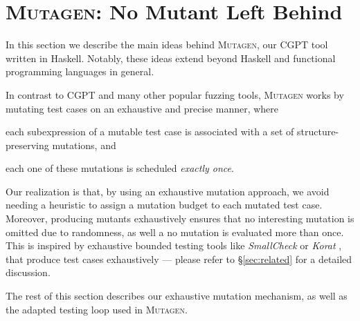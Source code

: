 \documentclass[sigconf,review,anonymous]{acmart}
\newcommand{\mutagen}{\textsc{Mutagen}\xspace}
\begin{document}
\section{\mutagen: No Mutant Left Behind}
\label{sec:mutagen}

In this section we describe the main ideas behind \mutagen, our CGPT tool
written in Haskell.
%
Notably, these ideas extend beyond Haskell and functional programming languages
in general.
%

In contrast to CGPT and many other popular fuzzing tools, \mutagen works by
mutating test cases on an exhaustive and precise manner, where
%
\begin{inparaenum}
  \item each subexpression of a mutable test case is associated with a set of
    structure-preserving mutations, and
  \item each one of these mutations is scheduled \emph{exactly once}.
\end{inparaenum}
%
%
Our realization is that, by using an exhaustive mutation approach, we avoid
needing a heuristic to assign a mutation budget to each mutated test case.
%
Moreover, producing mutants exhaustively ensures that no interesting mutation is
omitted due to randomness, as well a no mutation is evaluated more than once.
%
This is inspired by exhaustive bounded testing tools like \emph{SmallCheck}
\cite{runciman2008smallcheck} or \emph{Korat} \cite{boyapati2002korat}, that
produce test cases exhaustively --- please refer to \S \ref{sec:related}
for a detailed discussion.


The rest of this section describes our exhaustive mutation mechanism, as well as
the adapted testing loop used in \mutagen.

\end{document}
